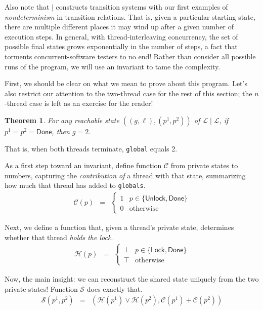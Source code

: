 \documentclass{amsbook}
\newtheorem{theorem}{Theorem}[chapter]
\theoremstyle{definition}
\theoremstyle{remark}
\numberwithin{section}{chapter}
\numberwithin{equation}{chapter}
\begin{document}
Also note that $\mid$ constructs transition systems with our first examples of \emph{nondeterminism} in transition relations.
That is, given a particular starting state, there are multiple different places it may wind up after a given number of execution steps.
In general, with thread-interleaving concurrency, the set of possible final states grows exponentially in the number of steps, a fact that torments concurrent-software testers to no end!
Rather than consider all possible runs of the program, we will use an invariant to tame the complexity.

First, we should be clear on what we mean to prove about this program.
Let's also restrict our attention to the two-thread case for the rest of this section; the $n$-thread case is left as an exercise for the reader!
\begin{theorem}
  For any reachable state $((g, \ell), (p^1, p^2))$ of $\mathcal L \mid \mathcal L$, if $p^1 = p^2 = \mathsf{Done}$, then $g = 2$.
\end{theorem}
That is, when both threads terminate, \texttt{global} equals 2.

As a first step toward an invariant, define function $\mathcal C$ from private states to numbers, capturing the \emph{contribution of} a thread with that state, summarizing how much that thread has added to \texttt{globals}.
\begin{eqnarray*}
  \mathcal C(p) &=& \begin{cases}
    1 & p \in \{\mathsf{Unlock}, \mathsf{Done}\} \\
    0 & \mathrm{otherwise}
  \end{cases}
\end{eqnarray*}

Next, we define a function that, given a thread's private state, determines whether that thread \emph{holds the lock}.
\begin{eqnarray*}
  \mathcal H(p) &=& \begin{cases}
    \bot & p \in \{\mathsf{Lock}, \mathsf{Done}\} \\
    \top & \mathrm{otherwise}
  \end{cases}
\end{eqnarray*}

Now, the main insight: we can reconstruct the shared state uniquely from the two private states!
Function $\mathcal S$ does exactly that.
\begin{eqnarray*}
  \mathcal S(p^1, p^2) &=& (\mathcal H(p^1) \lor \mathcal H(p^2), \mathcal C(p^1) + \mathcal C(p^2))
\end{eqnarray*}
\end{document}
